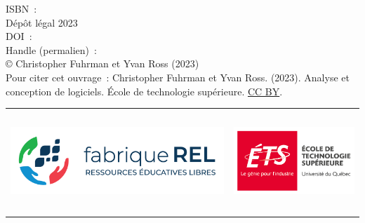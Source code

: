 

ISBN~: \\
Dépôt légal 2023 \\
DOI~: \\
Handle (permalien)~: \\
© Christopher Fuhrman et Yvan Ross (2023)\\
Pour citer cet ouvrage~: Christopher Fuhrman et Yvan Ross. (2023). Analyse et conception de logiciels.
École de technologie supérieure. \href{https://creativecommons.org/licenses/by/4.0/deed.fr}{CC BY}.


\vfill
\begin{tabular}{m{3.5in}m{3.5in}}
\includegraphics[height=1.5in]{images/F-REL_logo-coul-horiz.png} &
\includegraphics[height=1.5in]{images/Logo_ETS_TypoGrise_D_FR_1.png}\\
\end{tabular}
